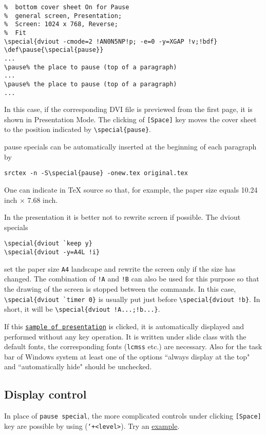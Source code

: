 \documentclass{article}
\begin{document}
\begin{verbatim}
%  bottom cover sheet On for Pause
%  general screen, Presentation;
%  Screen: 1024 x 768, Reverse; 
%  Fit
\special{dviout -cmode=2 !AN0N5NP!p; -e=0 -y=XGAP !v;!bdf}
\def\pause{\special{pause}}
...
\pause% the place to pause (top of a paragraph)
...
\pause% the place to pause (top of a paragraph)
...
\end{verbatim}
In this case, if the corresponding DVI file is previewed from the first page, 
it is shown in Presentation Mode.
The clicking of {\tt [Space]} key moves the cover sheet to the position 
indicated by \verb|\special{pause}|.

pause specials can be automatically inserted at the beginning of
each paragraph by
\begin{verbatim}
srctex -n -S\special{pause} -onew.tex original.tex
\end{verbatim}  
One can indicate in {\TeX} source so that, for example, the paper size equals 
10.24 inch $\times$ 7.68 inch.

In the presentation it is better not to rewrite screen if possible.
The dviout specials
\begin{verbatim}
\special{dviout `keep y}
\special{dviout -y=A4L !i}
\end{verbatim}
set the paper size {\tt A4} landscape and rewrite the screen only if the size
has changed.  The combination of {\tt !A} and {\tt !B} can also be used for 
this purpose so that the drawing of the screen is stopped between the commands.
In this case, \verb|\special{dviout `timer 0}| is usually put just before
\verb|\special{dviout !b}|.  In short, it will be 
\verb|\special{dviout !A...;!b...}|.

If this \href{file:slisampl.dvi}{{\tt sample of presentation}} is 
clicked, it is automatically displayed and performed without any key operation.
It is written under slide class with the default fonts, the 
corresponding fonts ({\tt lcmss} etc.) are necessary.  Also for the task bar 
of Windows system at least one of the options ``always display at the top" and 
``automatically hide" should be unchecked.

\subsection{Display control}
In place of {\tt pause special},
the more complicated controls under clicking \verb|[Space]| key are possible 
by using  ({\tt `+<level>}).
Try an \href{file:slisamp4.dvi}{example}.
\end{document}
